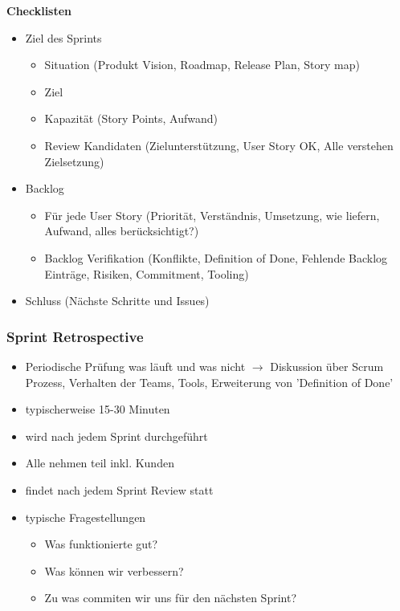 \documentclass{report}
\theoremstyle{definition}
\theoremstyle{example}
\begin{document}
\textbf{Checklisten}
\begin{itemize}
	\item {Ziel des Sprints
		\begin{itemize}
			\item Situation (Produkt Vision, Roadmap, Release Plan, Story map)
			\item Ziel
			\item Kapazität (Story Points, Aufwand)
			\item Review Kandidaten (Zielunterstützung, User Story OK, Alle verstehen Zielsetzung)
		\end{itemize}
	}
	\item {Backlog
		\begin{itemize}
			\item Für jede User Story (Priorität, Verständnis, Umsetzung, wie liefern, Aufwand, alles berücksichtigt?)
			\item Backlog Verifikation (Konflikte, Definition of Done, Fehlende Backlog Einträge, Risiken, Commitment, Tooling)
		\end{itemize}
	}
	\item Schluss (Nächste Schritte und Issues)
\end{itemize}

\subsubsection{Sprint Retrospective}
\begin{itemize}
	\item Periodische Prüfung was läuft und was nicht $\rightarrow$ Diskussion über Scrum Prozess, Verhalten der Teams, Tools, Erweiterung von 'Definition of Done'
	\item typischerweise 15-30 Minuten
	\item wird nach jedem Sprint durchgeführt
	\item Alle nehmen teil inkl. Kunden
	\item findet nach jedem Sprint Review statt
	\item {typische Fragestellungen
		\begin{itemize}
			\item Was funktionierte gut?
			\item Was können wir verbessern?
			\item Zu was commiten wir uns für den nächsten Sprint?
		\end{itemize}
	}
\end{itemize}
\end{document}
